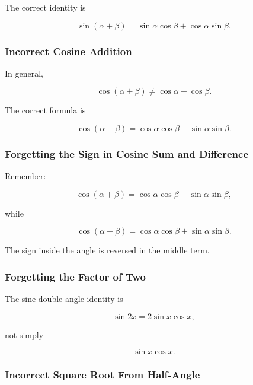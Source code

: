 The correct identity is

\[
\boxed{
\sin(\alpha+\beta)
=
\sin\alpha\cos\beta
+
\cos\alpha\sin\beta.
}
\]

\subsubsection{Incorrect Cosine Addition}

In general,

\[
\boxed{
\cos(\alpha+\beta)
\neq
\cos\alpha+\cos\beta.
}
\]

The correct formula is

\[
\boxed{
\cos(\alpha+\beta)
=
\cos\alpha\cos\beta
-
\sin\alpha\sin\beta.
}
\]

\subsubsection{Forgetting the Sign in Cosine Sum and Difference}

Remember:

\[
\boxed{
\cos(\alpha+\beta)
=
\cos\alpha\cos\beta
-
\sin\alpha\sin\beta,
}
\]

while

\[
\boxed{
\cos(\alpha-\beta)
=
\cos\alpha\cos\beta
+
\sin\alpha\sin\beta.
}
\]

The sign inside the angle is reversed in the middle term.

\subsubsection{Forgetting the Factor of Two}

The sine double-angle identity is

\[
\boxed{
\sin2x
=
2\sin x\cos x,
}
\]

not simply

\[
\sin x\cos x.
\]

\subsubsection{Incorrect Square Root From Half-Angle}


